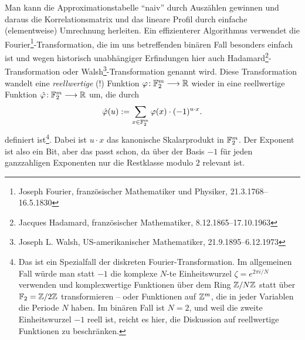 \begin{refsegment}
Man kann die Approximationstabelle "`naiv"' durch Auszählen gewinnen
und daraus die Korrelationsmatrix und das lineare Profil durch
einfache (elementweise) Umrechnung herleiten. Ein effizienterer
Algorithmus verwendet die Fourier\footnote{%
   Joseph Fourier, französischer Mathematiker und Physiker,
   21.3.1768--16.5.1830
}-Transformation, die im uns betreffenden
binären Fall besonders einfach ist und wegen historisch unabhängiger
Erfindungen hier auch Hadamard\footnote{%
   Jacques Hadamard, französischer Mathematiker, 8.12.1865--17.10.1963
}-Transformation oder Walsh\footnote{%
   Joseph L. Walsh, US-amerikanischer Mathematiker, 21.9.1895--6.12.1973
}-Transformation
genannt wird. Diese Transformation wandelt eine {\em reellwertige} (!)
Funktion $\varphi\!: \mathbb{F}_2^m \longrightarrow \mathbb{R}$ wieder in eine
reellwertige Funktion $\hat{\varphi}\!: \mathbb{F}_2^m \longrightarrow \mathbb{R}$
um, die durch
\[
  \hat{\varphi}(u) := \sum_{x \in \mathbb{F}_2^m} \varphi(x)\cdot (-1)^{u\cdot x}.
\]
definiert ist\footnote{%
   Das ist ein Spezialfall der diskreten
   Fourier-Transformation. Im
   allgemeinen Fall würde man statt $-1$ die komplexe $N$-te
   Einheitswurzel
   $\zeta = e^{2\pi i/N}$ verwenden und komplexwertige Funktionen über
   dem Ring $\mathbb{Z}/N\mathbb{Z}$ statt über $\mathbb{F}_2 = \mathbb{Z}/2\mathbb{Z}$ transformieren -- oder
   Funktionen auf $\mathbb{Z}^m$, die in jeder Variablen die Periode $N$ haben.
   Im binären Fall ist $N = 2$, und weil die zweite Einheitswurzel $-1$
   reell ist, reicht es hier, die Diskussion auf reellwertige Funktionen
   zu beschränken.
}. Dabei ist $u\cdot x$ das kanonische Skalarprodukt
in $\mathbb{F}_2^m$. Der Exponent ist also ein Bit, aber das passt schon,
da über der Basis $-1$ für jeden ganzzahligen Exponenten nur die
Restklasse modulo $2$ relevant ist.


\end{refsegment}
